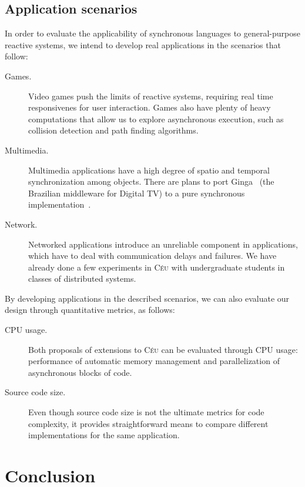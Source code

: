 \documentclass[pdftex,12pt,a4paper]{article}
\newcommand{\CEU}{\textsc{C\'{e}u}\xspace}
\begin{document}
\subsection{Application scenarios}

In order to evaluate the applicability of synchronous languages to 
general-purpose reactive systems, we intend to develop real applications in the
scenarios that follow:

\begin{description}
    \item [Games.]
    Video games push the limits of reactive systems, requiring real time 
    responsivenes for user interaction.
    Games also have plenty of heavy computations that allow us to explore 
    asynchronous execution, such as collision detection and path finding 
algorithms.

    \item [Multimedia.]
    Multimedia applications have a high degree of spatio and temporal 
    synchronization among objects.
    There are plans to port Ginga~\cite{ncl} (the Brazilian middleware for 
    Digital TV) to a pure synchronous implementation~\cite{ncl.sync}.

    \item [Network.]
    Networked applications introduce an unreliable component in applications, 
    which have to deal with communication delays and failures.
    We have already done a few experiments in \CEU with undergraduate students 
    in classes of distributed systems.
\end{description}

By developing applications in the described scenarios, we can also evaluate our 
design through quantitative metrics, as follows:

\begin{description}
    \item [CPU usage.]
    Both proposals of extensions to \CEU can be evaluated through CPU usage:
    performance of automatic memory management and
    parallelization of asynchronous blocks of code.
    \item [Source code size.]
    Even though source code size is not the ultimate metrics for code 
    complexity, it provides straightforward means to compare different 
implementations for the same application.
\end{description}

\section{Conclusion}
\end{document}

